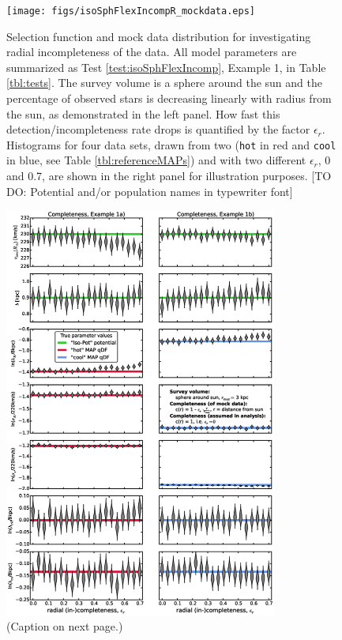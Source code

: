 
\begin{figure}
\texttt{[image: figs/isoSphFlexIncompR\_mockdata.eps]}
\caption{Selection function and mock data distribution for investigating radial incompleteness of the data. All model parameters are summarized as Test \ref{test:isoSphFlexIncomp}, Example 1, in Table \ref{tbl:tests}. The survey volume is a sphere around the sun and the percentage of observed stars is decreasing linearly with radius from the sun, as demonstrated in the left panel. How fast this detection/incompleteness rate drops is quantified by the factor $\epsilon_r$. Histograms for four data sets, drawn from two \MAPs{} (\texttt{hot} in red and \texttt{cool} in blue, see Table \ref{tbl:referenceMAPs}) and with two different $\epsilon_r$, 0 and 0.7, are shown in the right panel for illustration purposes. [TO DO: Potential and/or population names in typewriter font]} 
\label{fig:isoSphFlexIncompR_mockdata}
\end{figure}


\begin{figure}
\centering
\includegraphics[width=0.8\textwidth]{figs/isoSphFlexIncompR_violins.eps}
\caption{(Caption on next page.)}
\end{figure}


